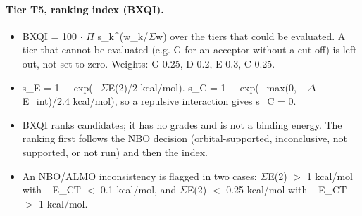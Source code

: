 \paragraph{Tier T5, ranking index (BXQI).}
\begin{itemize}[nosep,leftmargin=*]
\item BXQI = 100 $\cdot$ $\Pi$ s\_k\^{}(w\_k/$\Sigma$w) over the tiers that could be evaluated. A tier that cannot be evaluated (e.g. G for an acceptor without a cut-off) is left out, not set to zero. Weights: G 0.25, D 0.2, E 0.3, C 0.25.
\item s\_E = 1 $-$ exp($-\Sigma$E(2)/2 kcal/mol). s\_C = 1 $-$ exp($-$max(0, $-\Delta$E\_int)/2.4 kcal/mol), so a repulsive interaction gives s\_C = 0.
\item BXQI ranks candidates; it has no grades and is not a binding energy. The ranking first follows the NBO decision (orbital-supported, inconclusive, not supported, or not run) and then the index.
\item An NBO/ALMO inconsistency is flagged in two cases: $\Sigma$E(2) $>$ 1 kcal/mol with $-$E\_CT $<$ 0.1 kcal/mol, and $\Sigma$E(2) $<$ 0.25 kcal/mol with $-$E\_CT $>$ 1 kcal/mol.
\end{itemize}
